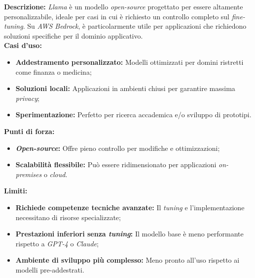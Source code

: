 \noindent \textbf{Descrizione:}
\textit{Llama} è un modello \textit{open-source} progettato per essere altamente personalizzabile, ideale per casi in cui è richiesto un controllo completo sul \textit{fine-tuning}. 
Su \textit{AWS Bedrock}, è particolarmente utile per applicazioni che richiedono soluzioni specifiche per il dominio applicativo.\\

\noindent \textbf{Casi d’uso:}
\begin{itemize}
    \item \textbf{Addestramento personalizzato:} Modelli ottimizzati per domini ristretti come finanza o medicina;
    \item \textbf{Soluzioni locali:} Applicazioni in ambienti chiusi per garantire massima \textit{privacy};
    \item \textbf{Sperimentazione:} Perfetto per ricerca accademica e/o sviluppo di prototipi.
\end{itemize}

\noindent \textbf{Punti di forza:}
\begin{itemize}
    \item \textbf{\textit{Open-source}:} Offre pieno controllo per modifiche e ottimizzazioni;
    \item \textbf{Scalabilità flessibile:} Può essere ridimensionato per applicazioni \textit{on-premises} o \textit{cloud}.
\end{itemize}

\noindent \textbf{Limiti:}
\begin{itemize}
    \item \textbf{Richiede competenze tecniche avanzate:} Il \textit{tuning} e l’implementazione necessitano di risorse specializzate;
    \item \textbf{Prestazioni inferiori senza \textit{tuning}:} Il modello base è meno performante rispetto a \textit{GPT-4} o \textit{Claude};
    \item \textbf{Ambiente di sviluppo più complesso:} Meno pronto all’uso rispetto ai modelli pre-addestrati.
\end{itemize}


